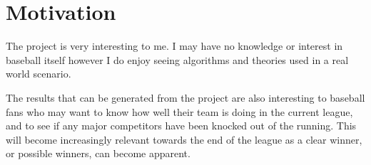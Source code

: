 \documentclass[11pt]{article}
\begin{document}
\section*{Motivation}

The project is very interesting to me. I may have no knowledge or interest
in baseball itself however I do enjoy seeing algorithms and theories used in
a real world scenario.

The results that can be generated from the project are also interesting to 
baseball fans who may want to know how well their team is doing in the current 
league, and to see if any major competitors have been knocked out of the 
running. This will become increasingly relevant towards the end of the league 
as a clear winner, or possible winners, can become apparent.
\end{document}
